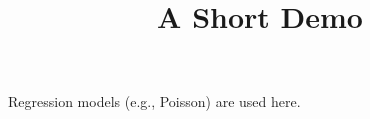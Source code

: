 \documentclass[article]{jss}
\title{A Short Demo}
\begin{document}
Regression models (e.g., Poisson) are used here.
\end{document}
